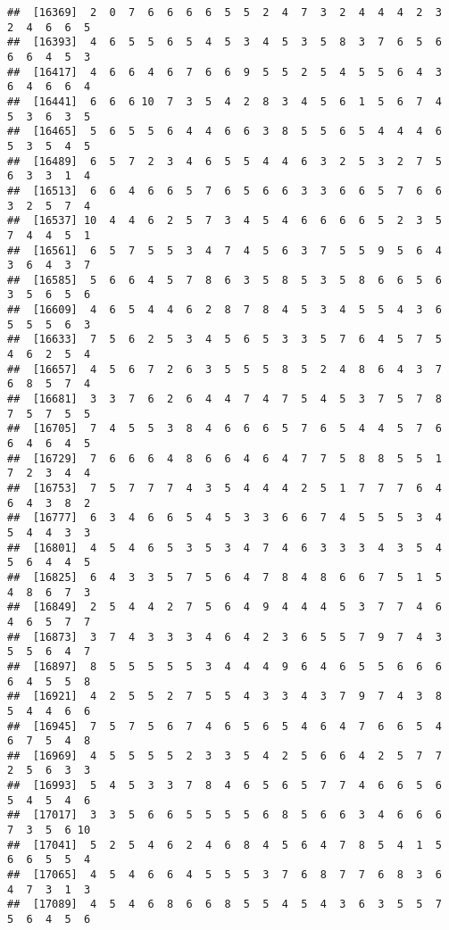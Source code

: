 \documentclass[
]{book}
\begin{document}
\begin{verbatim}
##  [16369]  2  0  7  6  6  6  6  5  5  2  4  7  3  2  4  4  4  2  3  2  4  6  6  5
##  [16393]  4  6  5  5  6  5  4  5  3  4  5  3  5  8  3  7  6  5  6  6  6  4  5  3
##  [16417]  4  6  6  4  6  7  6  6  9  5  5  2  5  4  5  5  6  4  3  6  4  6  6  4
##  [16441]  6  6  6 10  7  3  5  4  2  8  3  4  5  6  1  5  6  7  4  5  3  6  3  5
##  [16465]  5  6  5  5  6  4  4  6  6  3  8  5  5  6  5  4  4  4  6  5  3  5  4  5
##  [16489]  6  5  7  2  3  4  6  5  5  4  4  6  3  2  5  3  2  7  5  6  3  3  1  4
##  [16513]  6  6  4  6  6  5  7  6  5  6  6  3  3  6  6  5  7  6  6  3  2  5  7  4
##  [16537] 10  4  4  6  2  5  7  3  4  5  4  6  6  6  6  5  2  3  5  7  4  4  5  1
##  [16561]  6  5  7  5  5  3  4  7  4  5  6  3  7  5  5  9  5  6  4  3  6  4  3  7
##  [16585]  5  6  6  4  5  7  8  6  3  5  8  5  3  5  8  6  6  5  6  3  5  6  5  6
##  [16609]  4  6  5  4  4  6  2  8  7  8  4  5  3  4  5  5  4  3  6  5  5  5  6  3
##  [16633]  7  5  6  2  5  3  4  5  6  5  3  3  5  7  6  4  5  7  5  4  6  2  5  4
##  [16657]  4  5  6  7  2  6  3  5  5  5  8  5  2  4  8  6  4  3  7  6  8  5  7  4
##  [16681]  3  3  7  6  2  6  4  4  7  4  7  5  4  5  3  7  5  7  8  7  5  7  5  5
##  [16705]  7  4  5  5  3  8  4  6  6  6  5  7  6  5  4  4  5  7  6  6  4  6  4  5
##  [16729]  7  6  6  6  4  8  6  6  4  6  4  7  7  5  8  8  5  5  1  7  2  3  4  4
##  [16753]  7  5  7  7  7  4  3  5  4  4  4  2  5  1  7  7  7  6  4  6  4  3  8  2
##  [16777]  6  3  4  6  6  5  4  5  3  3  6  6  7  4  5  5  5  3  4  5  4  4  3  3
##  [16801]  4  5  4  6  5  3  5  3  4  7  4  6  3  3  3  4  3  5  4  5  6  4  4  5
##  [16825]  6  4  3  3  5  7  5  6  4  7  8  4  8  6  6  7  5  1  5  4  8  6  7  3
##  [16849]  2  5  4  4  2  7  5  6  4  9  4  4  4  5  3  7  7  4  6  4  6  5  7  7
##  [16873]  3  7  4  3  3  3  4  6  4  2  3  6  5  5  7  9  7  4  3  5  5  6  4  7
##  [16897]  8  5  5  5  5  5  3  4  4  4  9  6  4  6  5  5  6  6  6  6  4  5  5  8
##  [16921]  4  2  5  5  2  7  5  5  4  3  3  4  3  7  9  7  4  3  8  5  4  4  6  6
##  [16945]  7  5  7  5  6  7  4  6  5  6  5  4  6  4  7  6  6  5  4  6  7  5  4  8
##  [16969]  4  5  5  5  5  2  3  3  5  4  2  5  6  6  4  2  5  7  7  2  5  6  3  3
##  [16993]  5  4  5  3  3  7  8  4  6  5  6  5  7  7  4  6  6  5  6  5  4  5  4  6
##  [17017]  3  3  5  6  6  5  5  5  5  6  8  5  6  6  3  4  6  6  6  7  3  5  6 10
##  [17041]  5  2  5  4  6  2  4  6  8  4  5  6  4  7  8  5  4  1  5  6  6  5  5  4
##  [17065]  4  5  4  6  6  4  5  5  5  3  7  6  8  7  7  6  8  3  6  4  7  3  1  3
##  [17089]  4  5  4  6  8  6  6  8  5  5  4  5  4  3  6  3  5  5  7  5  6  4  5  6

\end{verbatim}
\end{document}
